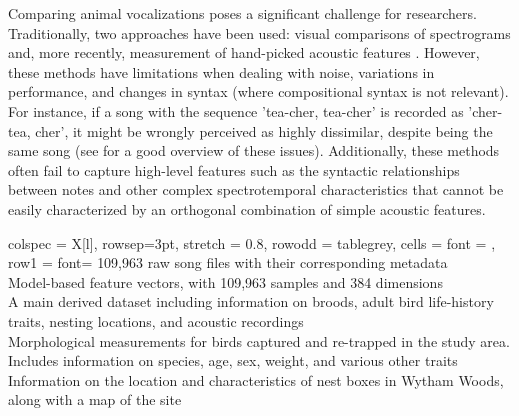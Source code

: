 Comparing animal vocalizations poses a significant challenge for researchers. Traditionally, two approaches have been used: visual comparisons of spectrograms and, more recently, measurement of hand-picked acoustic features \parencite{goffinet2021}. However, these methods have limitations when dealing with noise, variations in performance, and changes in syntax (where compositional syntax is not relevant). For instance, if a song with the sequence 'tea-cher, tea-cher' is recorded as 'cher-tea, cher', it might be wrongly perceived as highly dissimilar, despite being the same song (see \cite{stowell2021, zandberg2022} for a good overview of these issues). Additionally, these methods often fail to capture high-level features such as the syntactic relationships between notes and other complex spectrotemporal characteristics that cannot be easily characterized by an orthogonal combination of simple acoustic features.

\begin{table}[ht!]
    \centering
    \label{table:summary}
    \begin{tblr}[
        theme=ntabs
        ]{
        colspec = {X[l]},
        rowsep=3pt,
        stretch = 0.8,
        row{odd} = {tablegrey}, %
        cells = {font = \fontsize{8pt}{8pt}\selectfont},
        row{1} = {font=\fontsize{8pt}{8pt}\selectfont} %
    }
        109,963 raw song files with their corresponding metadata\\
        Model-based feature vectors, with 109,963 samples and 384 dimensions\\
        A main derived dataset including information on broods, adult bird life-history traits, nesting locations, and acoustic recordings\\
        Morphological measurements for birds captured and re-trapped in the study area. Includes information on species, age, sex, weight, and various other traits\\
        Information on the location and characteristics of nest boxes in Wytham Woods, along with a map of the site\\
    \end{tblr}
\end{table}

